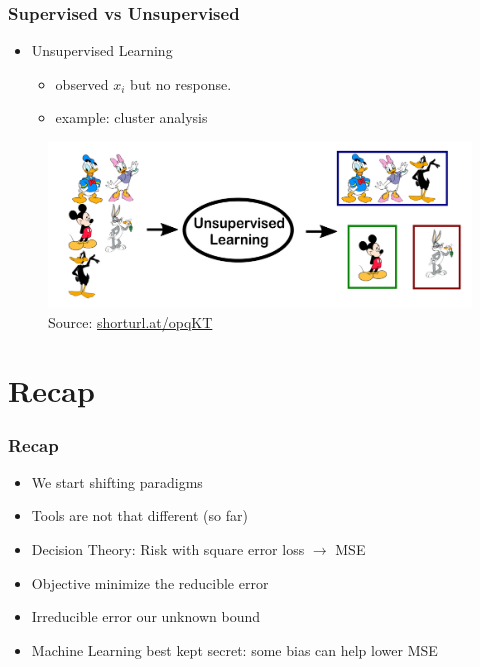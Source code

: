 \documentclass[
  shownotes,
  xcolor={svgnames},
  hyperref={colorlinks,citecolor=DarkBlue,linkcolor=DarkRed,urlcolor=DarkBlue}
  ]{beamer}
\begin{document}
\begin{frame}
\frametitle{Supervised vs Unsupervised}

\begin{itemize}
  \item Unsupervised Learning
  \begin{itemize}
    \item observed $x_i$ but no response.
    \item example: cluster analysis
  \end{itemize}
  \end{itemize}

\bigskip
    \begin{figure}[H] \centering

    \centering
    \includegraphics[scale=0.2]{figures/unsupevised}
  \\
  \tiny
  Source: \url{shorturl.at/opqKT}
\end{figure}


\end{frame}
\section{Recap}
\begin{frame}
\frametitle{Recap}

\begin{itemize}
    \item We start shifting paradigms
    \medskip
    \item Tools are not that different (so far)
    \medskip
    \item Decision Theory: Risk with square error loss $\rightarrow$ MSE
    \medskip
    \item Objective minimize the reducible error
    \medskip
    \item Irreducible error our unknown bound
    \medskip
    \item Machine Learning best kept secret:  some bias can help lower MSE
\end{itemize}
\end{frame}
\end{document}
